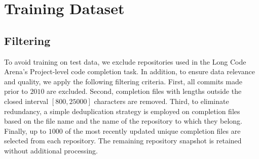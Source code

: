 \section{Training Dataset}
\subsection{Filtering}
\label{appendix:data-filtering}
To avoid training on test data, we exclude repositories used in the Long Code Arena's Project-level code completion task. In addition, to ensure data relevance and quality, we apply the following filtering criteria. First, all commits made prior to $2010$ are excluded. Second, completion files with lengths outside the closed interval $[800,25000]$ characters are removed. Third, to eliminate redundancy, a simple deduplication strategy is employed on completion files based on the file name and the name of the repository to which they belong. Finally, up to $1000$ of the most recently updated unique completion files are selected from each repository. The remaining repository snapshot is retained without additional processing.
